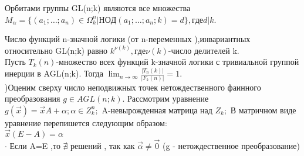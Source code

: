 \thr
Орбитами группы GL(n;k) являются все множества $M_\alpha=\{(a_1;\dots;a_n)\in \Omega_k^n|НОД(a_1;\dots;a_n;k)=d\},где d|k$.
                   
\cled
Число функций n-значной логики (от n-переменных ),инвариантных относительно GL(n;k) равно $k^{\nu(k)},где \nu(k)$-число делителей k.\\


\thr
Пусть $T_k(n)$-множество всех функций k-значной логики с тривиальной группой инерции в AGL(n;k). Тогда $  \lim_{n\to\infty} \frac{|T_n(k)|}{|F_k(n)|}  =1$.\\

)Оценим сверху число неподвижных точек нетождественного фаинного преобразования $g \in AGL(n;k)$.  Рассмотрим уравнение $g(\vec{x})=\vec{x}A+\alpha;\alpha \in Z_k^n;$ A-невырожденная матрица над $Z_k;$ В матричном виде уравнение перепишется следующим образом:\\
$\vec{x}(E-A)=\alpha $\\
$\cdot$ Если A=E ,то $\nexists$ решений , так как $\vec{\alpha}\neq \vec{0}$ (g - нетождественное преобразование)







